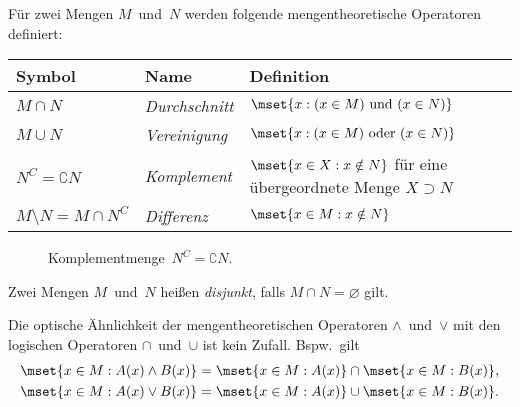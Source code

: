 \documentclass[a4paper]{article}
\begin{document}
\begin{definition}
    Für zwei Mengen $M$~und~$N$ werden folgende mengentheoretische Operatoren definiert:
    \begin{center}
        \begin{tabular}{@{}lll@{}}\toprule
            Symbol                       & Name                & Definition                                                               \\\midrule
            $M \cap N$                   & \emph{Durchschnitt} & $\mset{x : (x \in M) \text{ und } (x \in N)}$                            \\
            $M \cup N$                   & \emph{Vereinigung}  & $\mset{x : (x \in M) \text{ oder } (x \in N)}$                           \\
            $N^C = \complement N$        & \emph{Komplement}   & $\mset{x \in X : x \notin N}$ für eine übergeordnete Menge $X \supset N$ \\
            $M \setminus N = M \cap N^C$ & \emph{Differenz}    & $\mset{x \in M : x \notin N}$                                            \\\bottomrule
        \end{tabular}
    \end{center}
\end{definition}

\begin{figure}
    \caption{Komplementmenge~$N^C = \complement N$.}
\end{figure}

\begin{definition}[disjunkt]
    Zwei Mengen $M$~und~$N$ heißen \emph{disjunkt}, falls $M \cap N = \varnothing$ gilt.
\end{definition}

Die optische Ähnlichkeit der mengentheoretischen Operatoren $\wedge$~und~$\vee$ mit den logischen Operatoren $\cap$~und~$\cup$ ist kein Zufall. Bspw.\ gilt
\begin{gather*}
    \mset{x \in M : A(x) \wedge B(x)} = \mset{x \in M : A(x)} \cap \mset{x \in M : B(x)}, \\
    \mset{x \in M : A(x) \vee B(x)} = \mset{x \in M : A(x)} \cup \mset{x \in M : B(x)}.
\end{gather*}
\end{document}
